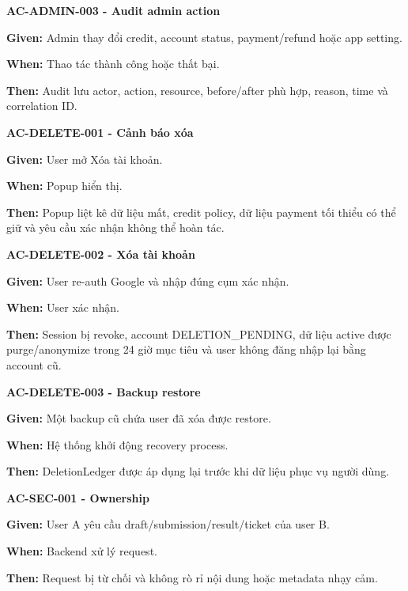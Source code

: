 \documentclass[11pt,a4paper]{article}
\begin{document}
\begin{acceptancebox}
\textbf{AC-ADMIN-003 - Audit admin action}\par
\textbf{Given:} Admin thay đổi credit, account status, payment/\allowbreak{}refund hoặc app setting.\par
\textbf{When:} Thao tác thành công hoặc thất bại.\par
\textbf{Then:} Audit lưu actor, action, resource, before/\allowbreak{}after phù hợp, reason, time và correlation ID.
\end{acceptancebox}

\begin{acceptancebox}
\textbf{AC-DELETE-001 - Cảnh báo xóa}\par
\textbf{Given:} User mở Xóa tài khoản.\par
\textbf{When:} Popup hiển thị.\par
\textbf{Then:} Popup liệt kê dữ liệu mất, credit policy, dữ liệu payment tối thiểu có thể giữ và yêu cầu xác nhận không thể hoàn tác.
\end{acceptancebox}

\begin{acceptancebox}
\textbf{AC-DELETE-002 - Xóa tài khoản}\par
\textbf{Given:} User re-auth Google và nhập đúng cụm xác nhận.\par
\textbf{When:} User xác nhận.\par
\textbf{Then:} Session bị revoke, account DELETION\_\allowbreak{}PENDING, dữ liệu active được purge/\allowbreak{}anonymize trong 24 giờ mục tiêu và user không đăng nhập lại bằng account cũ.
\end{acceptancebox}

\begin{acceptancebox}
\textbf{AC-DELETE-003 - Backup restore}\par
\textbf{Given:} Một backup cũ chứa user đã xóa được restore.\par
\textbf{When:} Hệ thống khởi động recovery process.\par
\textbf{Then:} DeletionLedger được áp dụng lại trước khi dữ liệu phục vụ người dùng.
\end{acceptancebox}

\begin{acceptancebox}
\textbf{AC-SEC-001 - Ownership}\par
\textbf{Given:} User A yêu cầu draft/\allowbreak{}submission/\allowbreak{}result/\allowbreak{}ticket của user B.\par
\textbf{When:} Backend xử lý request.\par
\textbf{Then:} Request bị từ chối và không rò rỉ nội dung hoặc metadata nhạy cảm.
\end{acceptancebox}
\end{document}
